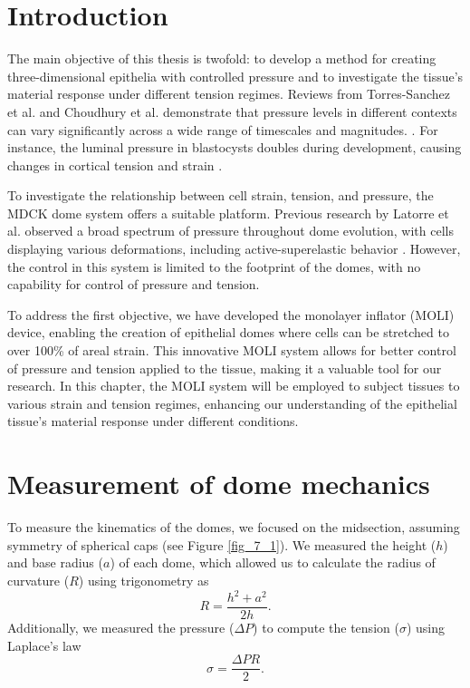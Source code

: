 \hypertarget{introduction}{%
\section{Introduction}\label{introduction2}}

The main objective of this thesis is twofold: to develop a method for
creating three-dimensional epithelia with controlled pressure and to
investigate the tissue's material response under different tension
regimes. Reviews from Torres-Sanchez et al. and Choudhury et al.
demonstrate that pressure levels in different contexts can vary
significantly across a wide range of timescales and magnitudes.
\cite{torres-sanchez2021, choudhury2022a}. For instance, the luminal pressure in blastocysts doubles
during development, causing changes in cortical tension and strain \cite{chan2019}.

To investigate the relationship between cell strain, tension, and
pressure, the MDCK dome system offers a suitable platform. Previous
research by Latorre et al. observed a broad spectrum of pressure
throughout dome evolution, with cells displaying various deformations,
including active-superelastic behavior \cite{latorre2018}. However,
the control in this system is limited to the footprint of the domes,
with no capability for control of pressure and tension.

To address the first objective, we have developed the monolayer inflator
(MOLI) device, enabling the creation of epithelial domes where cells can
be stretched to over 100\% of areal strain. This innovative MOLI system
allows for better control of pressure and tension applied to the tissue,
making it a valuable tool for our research. In this chapter, the MOLI
system will be employed to subject tissues to various strain and tension
regimes, enhancing our understanding of the epithelial tissue's material
response under different conditions.

\hypertarget{measurement-of-dome-mechanics}{%
	\section{Measurement of dome
		mechanics}\label{measurement-of-dome-mechanics}}


To measure the kinematics of the domes, we focused on the midsection, assuming symmetry of spherical caps (see Figure \ref{fig_7_1}). We measured the height ($h$) and base radius ($a$) of each dome, which allowed us to calculate the radius of curvature ($R$) using trigonometry as
\begin{equation}
	\label{eqn:radiuscurve}
	R = \frac{h^2 + a^2}{2h}.
\end{equation}
Additionally, we measured the pressure ($\Delta P$) to compute the tension ($\sigma$) using Laplace's law
\begin{equation}
	\label{eqn:laplace}
	\sigma = \frac{\Delta PR }{2} .
\end{equation}

